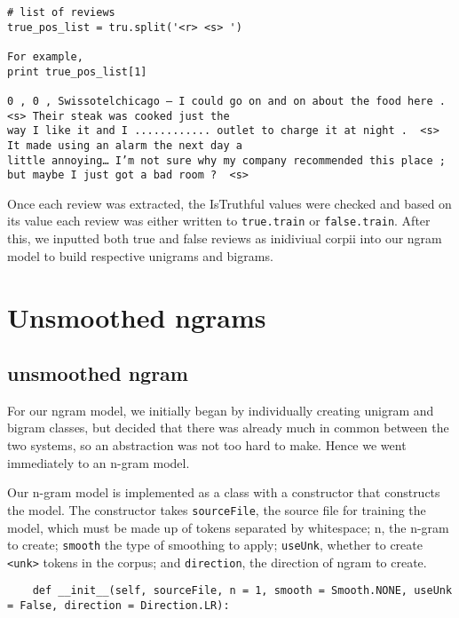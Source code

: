 \documentclass{article}
\begin{document}
{\small
\begin{verbatim}
# list of reviews
true_pos_list = tru.split('<r> <s> ')

For example, 
print true_pos_list[1]

0 , 0 , Swissotelchicago – I could go on and on about the food here .  <s> Their steak was cooked just the 
way I like it and I ............ outlet to charge it at night .  <s> It made using an alarm the next day a
little annoying… I’m not sure why my company recommended this place ;  but maybe I just got a bad room ?  <s>
\end{verbatim}
}
Once each review was extracted, the IsTruthful values were checked and based on its value each review was either written to \texttt{true.train} or \texttt{false.train}. After this, we inputted both true and false reviews as inidiviual corpii into our ngram model to build respective unigrams and bigrams. 

\section{Unsmoothed ngrams}

\subsection{unsmoothed ngram}

For our ngram model, we initially began by individually creating unigram and bigram classes, but decided that there was already much in common between the two systems, so an abstraction was not too hard to make. Hence we went immediately to an n-gram model. 

Our n-gram model is implemented as a class with a constructor that constructs the model. The constructor takes \texttt{sourceFile}, the source file for training the model, which must be made up of tokens separated by whitespace; n, the n-gram to create; \texttt{smooth} the type of smoothing to apply; \texttt{useUnk}, whether to create \texttt{<unk>} tokens in the corpus; and \texttt{direction}, the direction of ngram to create.

{\small\begin{verbatim}
    def __init__(self, sourceFile, n = 1, smooth = Smooth.NONE, useUnk = False, direction = Direction.LR):
\end{verbatim}}
\end{document}
